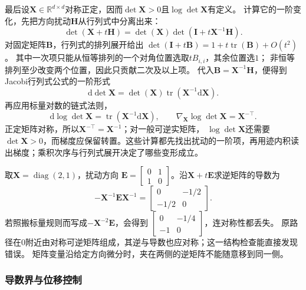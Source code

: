最后设$\bm{X}\in\mathbb{R}^{d\times d}$对称正定，因而$\det\bm{X}>0$且$\log\det\bm{X}$有定义。
计算它的一阶变化，先把方向扰动$\bm H$从行列式中分离出来：
\[
 \det(\bm X+t\bm H)=\det(\bm X)\det(\bm I+t\bm X^{-1}\bm H).
\]
对固定矩阵$\bm B$，行列式的排列展开给出
$\det(\bm I+t\bm B)=1+t\operatorname{tr}(\bm B)+O(t^2)$。
其中一次项只能从恒等排列的一个对角位置选取$tB_{i,i}$，其余位置选$1$；
非恒等排列至少改变两个位置，因此只贡献二次及以上项。
代入$\bm B=\bm X^{-1}\bm H$，便得到Jacobi行列式公式的一阶形式
\[   \mathrm{d}\det\bm{X}   =   \det(\bm{X})\operatorname{tr}   (\bm{X}^{-1}\mathrm{d}\bm{X}). \]
再应用标量对数的链式法则，
\begin{equation}
  \mathrm{d}\log\det\bm{X}
  =
  \operatorname{tr}(\bm{X}^{-1}\mathrm{d}\bm{X}),
  \qquad
  \nabla_{\bm{X}}\log\det\bm{X}
  =
  \bm{X}^{-\top}.
\label{eq:analysis-logdet-gradient}
\end{equation}
正定矩阵对称，所以$\bm{X}^{-\top}=\bm{X}^{-1}$；对一般可逆实矩阵， $\log\det\bm{X}$还需要$\det\bm{X}>0$，而梯度应保留转置。这些计算都先找出扰动的一阶项，再用迹内积读出梯度；乘积次序与行列式展开决定了哪些变形成立。
\begin{example}[逆矩阵微分中的乘法次序]
\label{ex:analysis-noncommuting-inverse-differential}
取$\bm X=\operatorname{diag}(2,1)$，扰动方向
$\bm E=\begin{bmatrix}0&1\\1&0\end{bmatrix}$。沿$\bm X+t\bm E$求逆矩阵的导数为
\[
 -\bm X^{-1}\bm E\bm X^{-1}
 =\begin{bmatrix}0&-1/2\\-1/2&0\end{bmatrix}.
\]
若照搬标量规则而写成$-\bm X^{-2}\bm E$，会得到
$\begin{bmatrix}0&-1/4\\-1&0\end{bmatrix}$，连对称性都丢失。
原路径在$0$附近由对称可逆矩阵组成，其逆与导数也应对称；这一结构检查能直接发现错误。
矩阵变量沿给定方向微分时，夹在两侧的逆矩阵不能随意移到同一侧。
\end{example}

\subsubsection{导数界与位移控制}


